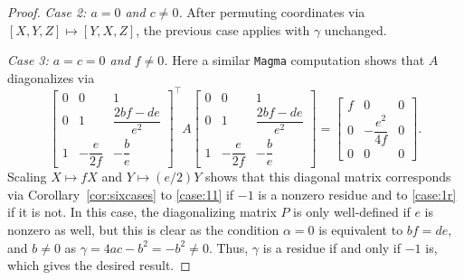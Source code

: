 \documentclass[10pt,a4paper]{amsart}
\numberwithin{equation}{section}
\numberwithin{figure}{section}
\numberwithin{table}{section}
\theoremstyle{definition}
\theoremstyle{plain}
\theoremstyle{remark}
\theoremstyle{plain}
\theoremstyle{definition}
\theoremstyle{plain}
\theoremstyle{plain}
\begin{document}
\begin{proof}
        \emph{Case 2: $a=0$ and $c\ne 0$.} After permuting coordinates via $[X,Y,Z]\mapsto[Y,X,Z]$, the previous case applies with $\gamma$ unchanged.
		
		\emph{Case 3: $a=c=0$ and $f\ne 0$.} Here a similar \texttt{Magma} computation shows that $A$ diagonalizes via
		\begin{equation*}
		\begin{bmatrix}
		0 & 0 & 1\\
		0 & 1 & \dfrac{2bf - de}{e^2}\\
		1 & -\dfrac{e}{2f} & -\dfrac{b}{e}
		\end{bmatrix}^\top\!
		A
		\begin{bmatrix}
		0 & 0 & 1\\
		0 & 1 & \dfrac{2bf - de}{e^2}\\
		1 & -\dfrac{e}{2f} & -\dfrac{b}{e}
		\end{bmatrix}
		=
		\begin{bmatrix}
		f&0&0\\
		0&-\dfrac{e^2}{4f}&0\\
		0&0&0
		\end{bmatrix}.
		\end{equation*}
		Scaling $X\mapsto fX$ and $Y\mapsto(e/2)Y$ shows that this diagonal matrix corresponds via Corollary~\ref{cor:sixcases} to \eqref{case:11} if $-1$ is a nonzero residue and to \eqref{case:1r} if it is not. In this case, the diagonalizing matrix $P$ is only well-defined if $e$ is nonzero as well, but this is clear as the condition $\alpha=0$ is equivalent to $bf=de$, and $b\ne 0$ as $\gamma=4ac-b^2=-b^2\ne 0$. Thus, $\gamma$ is a residue if and only if $-1$ is, which gives the desired result.


\end{proof}
\end{document}
